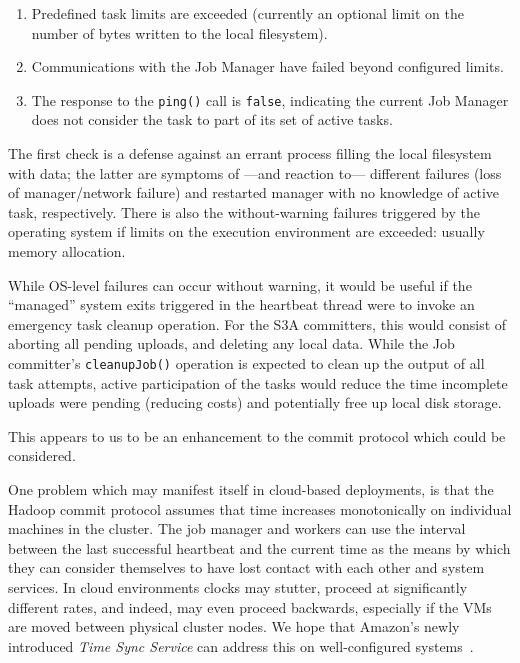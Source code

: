\documentclass[conference]{IEEEtran}
\begin{document}
\begin{enumerate}
  \item Predefined task limits are exceeded
  (currently an optional limit on the number of bytes written to the local filesystem).
  \item Communications with the Job Manager have failed beyond configured limits.
  \item The response to the \texttt{ping()} call is \texttt{false}, indicating the current
  Job Manager does not consider the task to part of its set of active tasks.
\end{enumerate}

The first check is a defense against an errant process filling the local
filesystem with data;
the latter are symptoms of ---and reaction to--- different failures (loss of manager/network failure)
and restarted manager with no knowledge of active task, respectively.
There is also the without-warning failures triggered by the operating system
if limits on the execution environment are exceeded: usually memory allocation.

While OS-level failures can occur without warning, it would be useful if the
``managed'' system exits triggered in the heartbeat thread were to invoke
an emergency task cleanup operation.
For the S3A committers, this would consist of aborting all pending uploads, and
deleting any local data.
While the Job committer's \texttt{cleanupJob()} operation is expected to clean up
the output of all task attempts, active participation of the tasks would
reduce the time incomplete uploads were pending (reducing costs) and
potentially free up local disk storage.

This appears to us to be an enhancement to the commit protocol which could
be considered.


One problem which may manifest itself in cloud-based deployments,
is that the Hadoop commit protocol assumes that time increases monotonically
on individual machines in the cluster.
The job manager and workers can use the interval between the last successful heartbeat
and the current time as the means by which they can consider themselves to have lost
contact with each other and system services.
In cloud environments clocks may stutter, proceed at significantly different rates,
and indeed, may even proceed backwards, especially if the VMs are moved between
physical cluster nodes.
We hope that Amazon's newly introduced \emph{Time Sync Service}
can address this on well-configured systems\ \cite{AWS-clock-service}.
\end{document}
